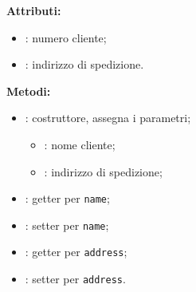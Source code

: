 %

\textbf{Attributi:}
\begin{itemize}
	\item {}: numero cliente;
	\item {}: indirizzo di spedizione.
\end{itemize}

\textbf{Metodi:}
\begin{itemize}
	\item {}: costruttore, assegna i parametri;
	\begin{itemize}
		\item {}: nome cliente;
		\item {}: indirizzo di spedizione;
	\end{itemize}
	\item {}: getter per \texttt{name};
	\item {}: setter per \texttt{name};
	\item {}: getter per \texttt{address};
	\item {}: setter per \texttt{address}.
\end{itemize}


